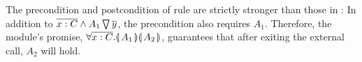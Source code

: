 {The precondition and postcondition of   rule {} are strictly stronger than  those in  {}: In addition to $\overline {x:C} \wedge \PushAS y {A_1}$, the precondition also requires $A_1$. Therefore, the module's promise, $  {\TwoStatesQ {\overline {x:C}} {A_1}{A_2}}$, guarantees that after exiting the external call, $A_2$ will hold.
} 

%
%








